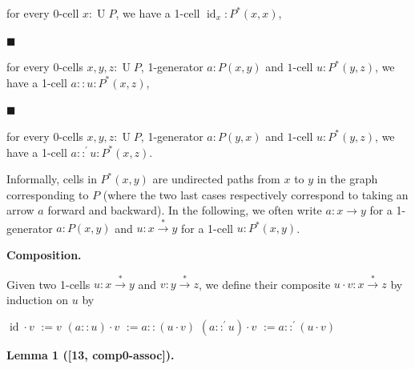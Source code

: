 \documentclass[10pt,a4paper]{amsart}
\begin{document}
for every 0-cell $x:\operatorname{U}P$, we have a 1-cell $\operatorname{id}_{x}:P^{*}(x,x)$,\par
 
 
 
\par\noindent  $\blacksquare$ 
 
for every 0-cells $x,y,z:\operatorname{U}P$, 1-generator $a:P(x,y)$ and $1$-cell $u:P^{*}(y,z)$, we have a 1-cell $a::u:P^{*}(x,z)$,\par
 
 
 
\par\noindent  $\blacksquare$ 
 
for every 0-cells $x,y,z:\operatorname{U}P$, 1-generator $a:P(y,x)$ and $1$-cell $u:P^{*}(y,z)$, we have a 1-cell $a::^{\prime}u:P^{*}(x,z)$.\par
 
 
  
Informally, cells in $P^{*}(x,y)$ are undirected paths from $x$ to $y$ in the graph corresponding to $P$ (where the two last cases respectively correspond to taking an arrow $a$ forward and backward). In the following, we often write $a:x\to y$ for a 1-generator $a:P(x,y)$ and $u:x\overset{*}{\to}y$ for a 1-cell $u:P^{*}(x,y)$.\par
 
 
 
 
\par\medskip\noindent\textbf{Composition.}\par
 
 
Given two 1-cells $u:x\overset{*}{\to}y$ and $v:y\overset{*}{\to}z$, we define their composite $u\cdot{}v:x\overset{*}{\to}z$ by induction on $u$ by\par
    $\displaystyle\operatorname{id}\cdot{}v$ $\displaystyle:=v$ $\displaystyle(a::u)\cdot{}v$ $\displaystyle:=a::(u\cdot{}v)$ $\displaystyle(a::^{\prime}u)\cdot{}v$ $\displaystyle:=a::^{\prime}(u\cdot{}v)$    
 
 
\par\medskip\noindent\textbf{Lemma 1 ([13, comp0-assoc]).}\par
 
\end{document}
